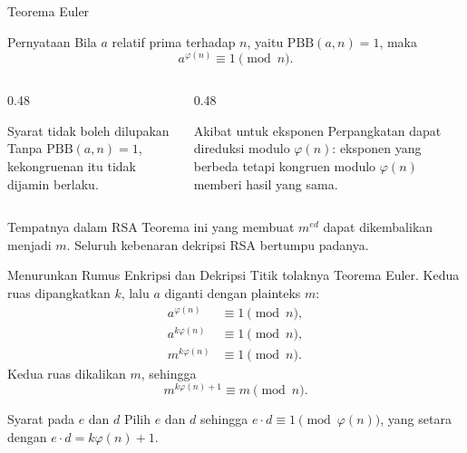\documentclass[aspectratio=169,11pt]{beamer}
\begin{document}
\begin{frame}{Teorema Euler}
    \footnotesize
    \begin{block}{Pernyataan}
        Bila $a$ relatif prima terhadap $n$, yaitu $\text{PBB}(a,n) = 1$,
        maka
        \[
            a^{\varphi(n)} \equiv 1 \pmod{n}.
        \]
    \end{block}
    \vspace{0.1cm}
    \begin{columns}[T,onlytextwidth]
        \begin{column}{0.48\textwidth}
            \begin{alertblock}{Syarat tidak boleh dilupakan}
                Tanpa $\text{PBB}(a,n)=1$, kekongruenan itu tidak dijamin
                berlaku.
            \end{alertblock}
        \end{column}
        \begin{column}{0.48\textwidth}
            \begin{exampleblock}{Akibat untuk eksponen}
                Perpangkatan dapat direduksi modulo $\varphi(n)$: eksponen
                yang berbeda tetapi kongruen modulo $\varphi(n)$ memberi
                hasil yang sama.
            \end{exampleblock}
        \end{column}
    \end{columns}
    \vspace{0.1cm}
    \begin{block}{Tempatnya dalam RSA}
        Teorema ini yang membuat $m^{ed}$ dapat dikembalikan menjadi $m$.
        Seluruh kebenaran dekripsi RSA bertumpu padanya.
    \end{block}
\end{frame}

\begin{frame}{Menurunkan Rumus Enkripsi dan Dekripsi}
    \footnotesize
    Titik tolaknya Teorema Euler. Kedua ruas dipangkatkan $k$, lalu $a$
    diganti dengan plainteks $m$:
    \begin{align*}
        a^{\varphi(n)} &\equiv 1 \pmod{n}, \\
        a^{k\varphi(n)} &\equiv 1 \pmod{n}, \\
        m^{k\varphi(n)} &\equiv 1 \pmod{n}.
    \end{align*}
    Kedua ruas dikalikan $m$, sehingga
    \[
        m^{k\varphi(n)+1} \equiv m \pmod{n}.
    \]
    \begin{exampleblock}{Syarat pada $e$ dan $d$}
        \footnotesize
        Pilih $e$ dan $d$ sehingga $e \cdot d \equiv 1 \pmod{\varphi(n)}$,
        yang setara dengan $e \cdot d = k\varphi(n) + 1$.
    \end{exampleblock}
\end{frame}
\end{document}
